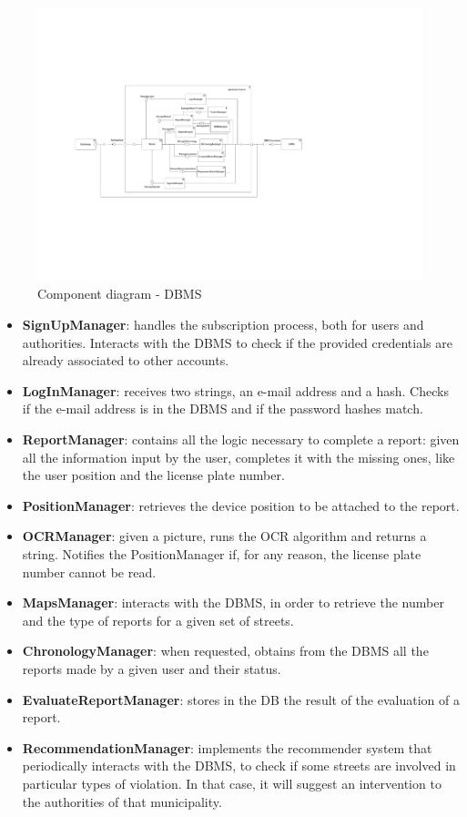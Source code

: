 \documentclass[12pt,a4paper]{report}
\begin{document}
	\begin{figure}[H]
				\includegraphics[scale = 0.4, center]{ComponentDiagramDBMS}
				\caption{Component diagram - DBMS}
	\end{figure}
		\begin{itemize}
			\item\textbf{SignUpManager}: handles the subscription process, both for users and authorities. Interacts with the DBMS to check if the provided
			credentials are already associated to other accounts.
			\item\textbf{LogInManager}: receives two strings, an e-mail address and a hash. Checks if the e-mail address is in the DBMS and if the password
			hashes match.
			\item\textbf{ReportManager}: contains all the logic necessary to complete a report: given all the information input by the user, completes it with
			the missing ones, like the user position and the license plate number.
			\item\textbf{PositionManager}: retrieves the device position to be attached to the report.
			\item\textbf{OCRManager}: given a picture, runs the OCR algorithm and returns a string. Notifies the PositionManager if, for any reason, the license
			plate number cannot be read.
			\item\textbf{MapsManager}: interacts with the DBMS, in order to retrieve the number and the type of reports for a given set of streets.
			\item\textbf{ChronologyManager}: when requested, obtains from the DBMS all the reports made by a given user and their status.
			\item\textbf{EvaluateReportManager}: stores in the DB the result of the evaluation of a report.
			\item\textbf{RecommendationManager}: implements the recommender system that periodically interacts with the DBMS, to check if some streets are
			involved in particular types of violation. In that case, it will suggest an intervention to the authorities of that municipality.
		\end{itemize}
		
\end{document}
